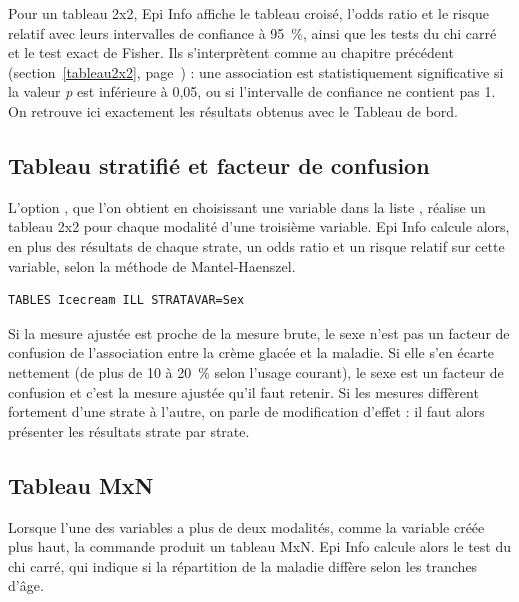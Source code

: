 Pour un tableau 2x2, Epi Info affiche le tableau croisé, l'odds ratio et le risque relatif avec leurs intervalles de confiance à 95~\%, ainsi que les tests du chi carré et le test exact de Fisher. Ils s'interprètent comme au chapitre précédent (section~\ref{tableau2x2}, page~\pageref{tableau2x2}) : une association est statistiquement significative si la valeur \textit{p} est inférieure à 0,05, ou si l'intervalle de confiance ne contient pas 1. On retrouve ici exactement les résultats obtenus avec le Tableau de bord.

\subsection{Tableau stratifié et facteur de confusion}

L'option , que l'on obtient en choisissant une variable dans la liste , réalise un tableau 2x2 pour chaque modalité d'une troisième variable. Epi Info calcule alors, en plus des résultats de chaque strate, un odds ratio et un risque relatif  sur cette variable, selon la méthode de Mantel-Haenszel.

\begin{tcolorbox}
	\begin{lstlisting}[language=EPIscript, style=mystyle, caption={Tableau 2x2 stratifié selon le sexe}, label=lst:stratavar]
TABLES Icecream ILL STRATAVAR=Sex
	\end{lstlisting}
\end{tcolorbox}

Si la mesure ajustée est proche de la mesure brute, le sexe n'est pas un facteur de confusion de l'association entre la crème glacée et la maladie. Si elle s'en écarte nettement (de plus de 10 à 20~\% selon l'usage courant), le sexe est un facteur de confusion et c'est la mesure ajustée qu'il faut retenir. Si les mesures diffèrent fortement d'une strate à l'autre, on parle de modification d'effet : il faut alors présenter les résultats strate par strate.

\subsection{Tableau MxN}

Lorsque l'une des variables a plus de deux modalités, comme la variable  créée plus haut, la commande  produit un tableau MxN. Epi Info calcule alors le test du chi carré, qui indique si la répartition de la maladie diffère selon les tranches d'âge.

